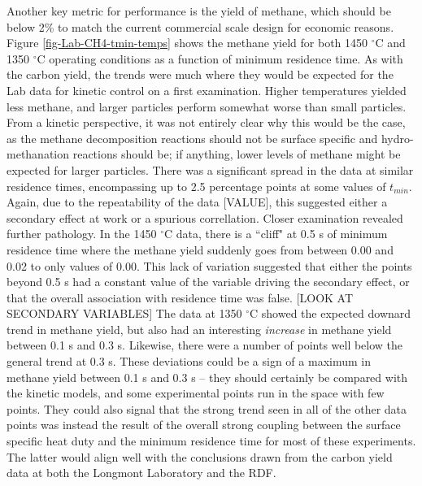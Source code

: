\documentclass[11pt,twocolumn]{article}
\begin{document}

Another key metric for performance is the yield of methane, which should be below 2\% to match the current commercial scale design for economic reasons.  Figure \ref{fig-Lab-CH4-tmin-temps} shows the methane yield for both 1450 $^{\circ}$C and 1350 $^{\circ}$C operating conditions as a function of minimum residence time.  As with the carbon yield, the trends were much where they would be expected for the Lab data for kinetic control on a first examination.  Higher temperatures yielded less methane, and larger particles perform somewhat worse than small particles.  From a kinetic perspective, it was not entirely clear why this would be the case, as the methane decomposition reactions should not be surface specific and hydro-methanation reactions should be; if anything, lower levels of methane might be expected for larger particles.  There was a significant spread in the data at similar residence times, encompassing up to 2.5 percentage points at some values of $t_{min}$.  Again, due to the repeatability of the data [VALUE], this suggested either a secondary effect at work or a spurious correllation.  Closer examination revealed further pathology.  In the 1450 $^{\circ}$C data, there is a ``cliff" at 0.5 s of minimum residence time where the methane yield suddenly goes from between 0.00 and 0.02 to only values of 0.00.  This lack of variation suggested that either the points beyond 0.5 s had a constant value of the variable driving the secondary effect, or that the overall association with residence time was false. [LOOK AT SECONDARY VARIABLES]  The data at 1350 $^{\circ}$C showed the expected downard trend in methane yield, but also had an interesting \emph{increase} in methane yield between 0.1 s and 0.3 s.  Likewise, there were a number of points well below the general trend at 0.3 s.  These deviations could be a sign of a maximum in methane yield between 0.1 s and 0.3 s -- they should certainly be compared with the kinetic models, and some experimental points run in the space with few points.  They could also signal that the strong trend seen in all of the other data points was instead the result of the overall strong coupling between the surface specific heat duty and the minimum residence time for most of these experiments.  The latter would align well with the conclusions drawn from the carbon yield data at both the Longmont Laboratory and the RDF.
\end{document}
